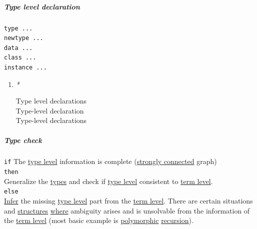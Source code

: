 \documentclass[11pt]{article}
\begin{document}
\subparagraph{\label{org14351b4}Type level declaration}
\label{sec:org446b18a}
\begin{verbatim}
type ...
newtype ...
data ...
class ...
instance ...
\end{verbatim}

\begin{enumerate}
\item \emph{*}
\label{sec:orgf33ce2c}

\label{org5dac7c1}Type level declarations\\
\label{orgfbcb7be}Type-level declaration\\
\label{orgcbf8a85}Type-level declarations\\
\end{enumerate}


\subparagraph{\label{orgf9abc5e}Type check}
\label{sec:org99ba3ff}
\texttt{if} The \hyperref[orgfe4cf3f]{type level} information is complete (\hyperref[org9753e4e]{strongly connected} graph)\\

\texttt{then}\\

Generalize the \hyperref[org4209edd]{types} and check if \hyperref[orgfe4cf3f]{type level} consistent to \hyperref[org4d02774]{term level}.\\

\texttt{else}\\

\hyperref[org6da926a]{Infer} the missing \hyperref[orgfe4cf3f]{type level} part from the \hyperref[org4d02774]{term level}. There are certain situations and \hyperref[orgc87c48c]{structures} \hyperref[org3e5903d]{where} ambiguity arises and is unsolvable from the information of the \hyperref[org4d02774]{term level} (most basic example is \hyperref[orgac4d581]{polymorphic} \hyperref[orgf98f6ca]{recursion}).\\
\end{document}
